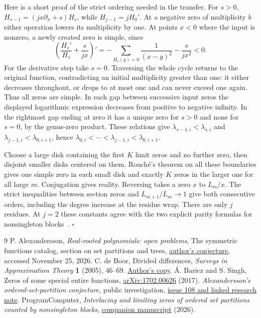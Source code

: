 \documentclass[11pt]{article}
\begin{document}
Here is a short proof of the strict ordering needed in the transfer. For $s>0$, $H_{s-1}=(jx\partial_x+s)H_s$, while $H_{j-1}=jH_0'$. At a negative zero of multiplicity $b$ either operation lowers its multiplicity by one. At points $x<0$ where the input is nonzero, a newly created zero is simple, since
\[
\left(\frac{H_s'}{H_s}+\frac{s}{jx}\right)'=-\sum_{H_s(y)=0}\frac{1}{(x-y)^2}-\frac{s}{jx^2}<0 .
\]
For the derivative step take $s=0$. Traversing the whole cycle returns to the original function, contradicting an initial multiplicity greater than one: it either decreases throughout, or drops to at most one and can never exceed one again. Thus all zeros are simple. In each gap between successive input zeros the displayed logarithmic expression decreases from positive to negative infinity. In the rightmost gap ending at zero it has a unique zero for $s>0$ and none for $s=0$, by the genus-zero product. These relations give $\lambda_{s-1,i}<\lambda_{s,i}$ and $\lambda_{j-1,i}<\lambda_{0,i+1}$, hence $\lambda_{0,i}<\cdots<\lambda_{j-1,i}<\lambda_{0,i+1}$.

Choose a large disk containing the first $K$ limit zeros and no further zero, then disjoint smaller disks centered on them. Rouché's theorem on all these boundaries gives one simple zero in each small disk and exactly $K$ zeros in the larger one for all large $m$. Conjugation gives reality. Reversing takes a zero $x$ to $L_m/x$. The strict inequalities between section zeros and $L_{m+1}/L_m\to1$ give both consecutive orders, including the degree increase at the residue wrap. There are only $j$ residues. At $j=2$ these constants agree with the two explicit parity formulas for nonsingleton blocks~\cite{companion}. $\square$

\begin{thebibliography}{9}
 P. Alexandersson, \emph{Real-rooted polynomials: open problems}, The symmetric functions catalog, section on set partitions and trees, \href{https://www.symmetricfunctions.com/realRootedOpenProblems.htm\#openProblemsSetPartitions}{author's conjecture}, accessed November 25, 2026.
 C. de Boor, Divided differences, \emph{Surveys in Approximation Theory} \textbf{1} (2005), 46--69. \href{https://pages.cs.wisc.edu/~deboor/sat/papers/2/2.pdf}{Author's copy}.
 \'{A}. Baricz and S. Singh, Zeros of some special entire functions, \href{https://arxiv.org/abs/1702.00626}{arXiv:1702.00626} (2017).
 \emph{Alexandersson's ordered-set-partition conjecture}, public investigation, \href{https://github.com/1337isnot1337/solved-conjectures/issues/108}{issue 108 and linked research note}.
 ProgramComputer, \emph{Interlacing and limiting zeros of ordered set partitions counted by nonsingleton blocks}, \href{https://github.com/ProgramComputer/open-math-research/blob/main/topics/ordered-large-blocks/paper.pdf}{companion manuscript} (2026).
\end{thebibliography}
\end{document}

